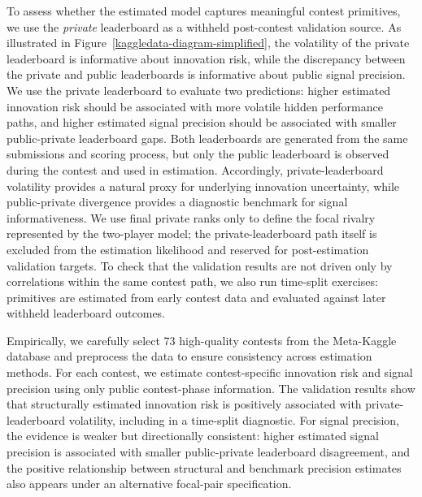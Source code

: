 \documentclass[mnsc]{informs3}
\begin{document}
To assess whether the estimated model captures meaningful contest primitives, we use the \textit{private} leaderboard as a withheld post-contest validation source.
As illustrated in Figure~\ref{kaggledata-diagram-simplified}, the volatility of the private leaderboard is informative about innovation risk, while the discrepancy between the private and public leaderboards is informative about public signal precision.
We use the private leaderboard to evaluate two predictions: higher estimated innovation risk should be associated with more volatile hidden performance paths, and higher estimated signal precision should be associated with smaller public-private leaderboard gaps.
Both leaderboards are generated from the same submissions and scoring process, but only the public leaderboard is observed during the contest and used in estimation.
Accordingly, private-leaderboard volatility provides a natural proxy for underlying innovation uncertainty, while public-private divergence provides a diagnostic benchmark for signal informativeness.
We use final private ranks only to define the focal rivalry represented by the two-player model; the private-leaderboard path itself is excluded from the estimation likelihood and reserved for post-estimation validation targets.
To check that the validation results are not driven only by correlations within the same contest path, we also run time-split exercises: primitives are estimated from early contest data and evaluated against later withheld leaderboard outcomes.


Empirically, we carefully select 73 high-quality contests from the Meta-Kaggle database and preprocess the data to ensure consistency across estimation methods.
For each contest, we estimate contest-specific innovation risk and signal precision using only public contest-phase information.
The validation results show that structurally estimated innovation risk is positively associated with private-leaderboard volatility, including in a time-split diagnostic.
For signal precision, the evidence is weaker but directionally consistent: higher estimated signal precision is associated with smaller public-private leaderboard disagreement, and the positive relationship between structural and benchmark precision estimates also appears under an alternative focal-pair specification.
\end{document}
